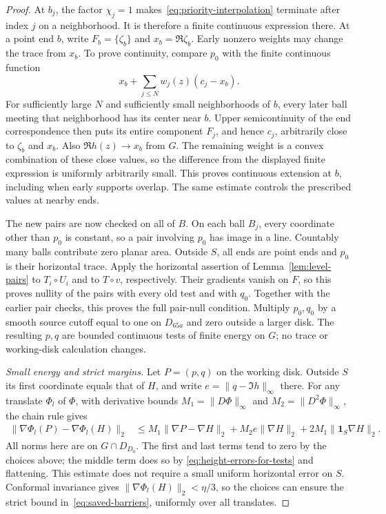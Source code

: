 \begin{proof}
At $b_j$, the factor $\chi_j=1$ makes~\eqref{eq:priority-interpolation}
terminate after index $j$ on a neighborhood.  It is therefore a finite
continuous expression there.  At a point end $b$, write
$F_b=\{\zeta_b\}$ and $x_b=\Re\zeta_b$.  Early nonzero weights may
change the trace from $x_b$.  To prove continuity, compare $p_0$ with
the finite continuous function
\[
 x_b+\sum_{j\le N}w_j(z)(c_j-x_b).
\]
For sufficiently large $N$ and sufficiently small neighborhoods of $b$,
every later ball meeting that neighborhood has its center near $b$.
Upper semicontinuity of the end correspondence then puts its entire
component $F_j$, and hence $c_j$, arbitrarily close to $\zeta_b$ and
$x_b$.  Also $\Re h(z)\to x_b$ from $G$.  The remaining weight is a
convex combination of these close values, so the difference from the
displayed finite expression is uniformly arbitrarily small.  This proves
continuous extension at $b$, including when early supports overlap.
The same estimate controls the prescribed values at nearby ends.

The new pairs are now checked on all of $B$.  On each ball $B_j$, every
coordinate other than $p_0$ is constant, so a pair involving $p_0$ has
image in a line.  Countably many balls contribute zero planar area.
Outside $S$, all ends are point ends and $p_0$ is their horizontal
trace.  Apply the horizontal assertion of Lemma~\ref{lem:level-pairs}
to $T_i\circ U_i$ and to $T\circ v$, respectively.  Their gradients
vanish on $F$, so this proves nullity of the pairs with every old test
and with $q_0$.  Together with the earlier pair checks, this proves the
full pair-null condition.  Multiply $p_0,q_0$ by a smooth source cutoff
equal to one on $D_{65a}$ and zero outside a larger disk.  The resulting
$p,q$ are bounded continuous tests of finite energy on $G$; no trace or
working-disk calculation changes.

\emph{Small energy and strict margins.}
Let $P=(p,q)$ on the working disk.  Outside $S$ its first coordinate
equals that of $H$, and write $e=\|q-\Im h\|_\infty$ there.  For any
translate $\Phi_l$ of $\Phi$, with derivative bounds
$M_1=\|D\Phi\|_\infty$ and $M_2=\|D^2\Phi\|_\infty$, the chain rule
gives
\begin{align}\label{eq:barrier-comparison}
 \|\nabla\Phi_l(P)-\nabla\Phi_l(H)\|_2
 &\le M_1\|\nabla P-\nabla H\|_2
       +M_2 e\|\nabla H\|_2
       +2M_1\|\mathbf1_S\nabla H\|_2 .
\end{align}
All norms here are on $G\cap D_{D_0}$.  The first and last terms tend
to zero by the choices above; the middle term does so by
\eqref{eq:height-errors-for-tests} and flattening.  This estimate does
not require a small uniform horizontal error on $S$.  Conformal
invariance gives $\|\nabla\Phi_l(H)\|_2<\eta/3$, so the choices can
ensure the strict bound in~\eqref{eq:saved-barriers}, uniformly over
all translates.


\end{proof}
